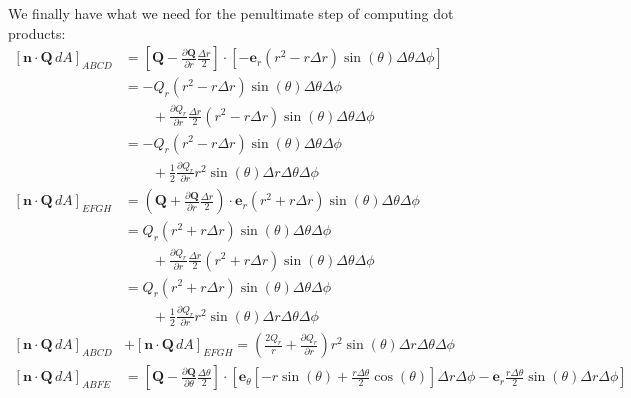 \documentclass[a4paper]{article}
\begin{document}
We finally have what we need for the penultimate step of computing dot products:
\begin{align*}
	\!\left[ \pmb{n} \cdot \pmb{Q} \, dA \right]_{ABCD} & = \!\left[ \pmb{Q} - \frac{\partial \pmb{Q}}{\partial r}\frac{\Delta r}{2} \right] \cdot \!\left[ -\pmb{e}_{r}\!\left( r^{2} - r \Delta r \right)\sin\!\left(\theta\right)\Delta \theta \Delta \phi \right] \\
	 & = -Q_{r}\!\left( r^{2} - r \Delta r \right)\sin\!\left(\theta\right)\Delta \theta \Delta \phi \\
	 & \qquad + \frac{\partial Q_{r}}{\partial r}\frac{\Delta r}{2}\!\left( r^{2} - r \Delta r \right)\sin\!\left(\theta\right)\Delta \theta \Delta \phi \\ 
	 & = -Q_{r}\!\left( r^{2} - r \Delta r \right)\sin\!\left(\theta\right)\Delta \theta \Delta \phi \\
	 & \qquad + \frac{1}{2}\frac{\partial Q_{r}}{\partial r}r^{2}\sin\!\left(\theta\right)\Delta r \Delta \theta \Delta \phi \\
	\!\left[ \pmb{n} \cdot \pmb{Q} \, dA \right]_{EFGH} & = \!\left( \pmb{Q} + \frac{\partial \pmb{Q}}{\partial r}\frac{\Delta r}{2} \right) \cdot \pmb{e}_{r}\!\left( r^{2} + r \Delta r \right)\sin\!\left(\theta\right)\Delta \theta \Delta \phi \\
	 & = Q_{r}\!\left( r^{2} + r \Delta r \right)\sin\!\left(\theta\right)\Delta \theta \Delta \phi \\
	 & \qquad + \frac{\partial Q_{r}}{\partial r}\frac{\Delta r}{2}\!\left( r^{2} + r \Delta r \right)\sin\!\left(\theta\right)\Delta \theta \Delta \phi \\ 
	 & = Q_{r}\!\left( r^{2} + r \Delta r \right)\sin\!\left(\theta\right)\Delta \theta \Delta \phi \\
	 & \qquad + \frac{1}{2}\frac{\partial Q_{r}}{\partial r}r^{2}\sin\!\left(\theta\right)\Delta r \Delta \theta \Delta \phi \\
	\!\left[ \pmb{n} \cdot \pmb{Q} \, dA \right]_{ABCD} & + \!\left[ \pmb{n} \cdot \pmb{Q} \, dA \right]_{EFGH} = \boxed{\!\left( \frac{2Q_{r}}{r} + \frac{\partial Q_{r}}{\partial r} \right)r^{2}\sin\!\left(\theta\right)\Delta r \Delta \theta \Delta \phi} \\
	\!\left[ \pmb{n} \cdot \pmb{Q} \, dA \right]_{ABFE} & = \!\left[ \pmb{Q} - \frac{\partial \pmb{Q}}{\partial \theta}\frac{\Delta \theta}{2} \right] \cdot \!\left[ \pmb{e}_{\theta}\!\left[ -r \sin\!\left(\theta\right) + \frac{r \Delta \theta}{2}\cos\!\left(\theta\right) \right]\Delta r \Delta \phi - \pmb{e}_{r}\frac{r \Delta \theta}{2}\sin\!\left(\theta\right)\Delta r \Delta \phi \right] \\

\end{align*}
\end{document}
